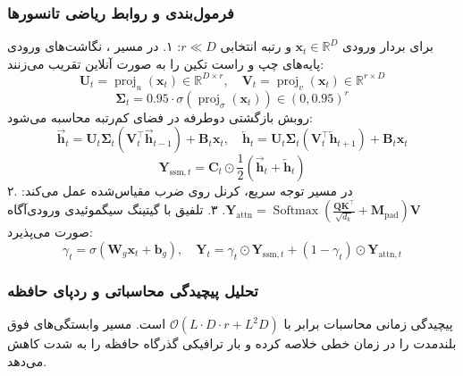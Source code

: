 \subsubsection*{فرمول‌بندی و روابط ریاضی تانسورها}
برای بردار ورودی $\mathbf{x}_t \in \mathbb{R}^D$ و رتبه انتخابی $r \ll D$:
۱. در مسیر ، نگاشت‌های ورودی پایه‌های چپ و راست تکین را به صورت آنلاین تقریب می‌زنند:
\begin{equation}
\mathbf{U}_t = \operatorname{proj}_u(\mathbf{x}_t) \in \mathbb{R}^{D \times r}, \quad \mathbf{V}_t = \operatorname{proj}_v(\mathbf{x}_t) \in \mathbb{R}^{r \times D}
\end{equation}
\begin{equation}
\mathbf{\Sigma}_t = 0.95 \cdot \sigma(\operatorname{proj}_\sigma(\mathbf{x}_t)) \in (0, 0.95)^r
\end{equation}
روبش بازگشتی دوطرفه در فضای کم‌رتبه محاسبه می‌شود:
\begin{equation}
\vec{\mathbf{h}}_t = \mathbf{U}_t \mathbf{\Sigma}_t (\mathbf{V}_t^\top \vec{\mathbf{h}}_{t-1}) + \mathbf{B}_t \mathbf{x}_t, \quad \overleftarrow{\mathbf{h}}_t = \mathbf{U}_t \mathbf{\Sigma}_t (\mathbf{V}_t^\top \overleftarrow{\mathbf{h}}_{t+1}) + \mathbf{B}_t \mathbf{x}_t
\end{equation}
\begin{equation}
\mathbf{Y}_{\text{ssm}, t} = \mathbf{C}_t \odot \frac{1}{2}(\vec{\mathbf{h}}_t + \overleftarrow{\mathbf{h}}_t)
\end{equation}
۲. در مسیر توجه سریع، کرنل  روی ضرب مقیاس‌شده عمل می‌کند: $\mathbf{Y}_{\text{attn}} = \operatorname{Softmax}\left(\frac{\mathbf{Q} \mathbf{K}^\top}{\sqrt{d_k}} + \mathbf{M}_{\text{pad}}\right) \mathbf{V}$.
۳. تلفیق با گیتینگ سیگموئیدی ورودی‌آگاه صورت می‌پذیرد:
\begin{equation}
\gamma_t = \sigma(\mathbf{W}_g \mathbf{x}_t + \mathbf{b}_g), \quad \mathbf{Y}_t = \gamma_t \odot \mathbf{Y}_{\text{ssm}, t} + (1 - \gamma_t) \odot \mathbf{Y}_{\text{attn}, t}
\end{equation}

\subsubsection*{تحلیل پیچیدگی محاسباتی و ردپای حافظه}
پیچیدگی زمانی محاسبات برابر با $\mathcal{O}(L \cdot D \cdot r + L^2 D)$ است. مسیر  وابستگی‌های فوق بلندمدت را در زمان خطی خلاصه کرده و بار ترافیکی گذرگاه حافظه را به شدت کاهش می‌دهد.


